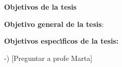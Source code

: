 \begin{abstract}
	[Redactar el abstract]  
\end{abstract}
\newpage

\begin{center}
	{\large \textbf{Objetivos de la tesis}}
\end{center}
\qquad 

\qquad \textbf{Objetivo general de la tesis}: 

\qquad 


\qquad 

\qquad \textbf{Objetivos espec\'{\i}ficos de la tesis:}

\qquad 

-) [Preguntar a profe Marta]